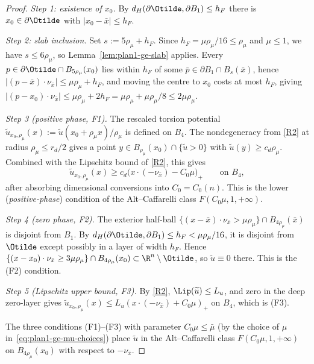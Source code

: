 \begin{proof}
\emph{Step 1: existence of \(x_0\).} By
\(d_H(\partial\Otilde,\partial B_1)\le h_F\) there is
\(x_0\in\partial\Otilde\) with \(|x_0-\bar x|\le h_F\).

\emph{Step 2: slab inclusion.} Set \(s:=5\rho_\mu+h_F\). Since
\(h_F=\mu\rho_\mu/16\le\rho_\mu\) and \(\mu\le 1\), we have
\(s\le 6\rho_\mu\), so Lemma~\ref{lem:plan1-ge-slab} applies. Every
\(p\in\partial\Otilde\cap B_{5\rho_\mu}(x_0)\) lies within \(h_F\) of
some \(\bar p\in\partial B_1\cap B_s(\bar x)\), hence
\(|(p-\bar x)\cdot\nu_{\bar x}|\le\mu\rho_\mu+h_F\), and moving the
centre to \(x_0\) costs at most \(h_F\), giving
\(|(p-x_0)\cdot\nu_{\bar x}|\le\mu\rho_\mu+2h_F=\mu\rho_\mu+\mu\rho_\mu/8
\le 2\mu\rho_\mu\).

\emph{Step 3 (positive phase, F1).} The rescaled torsion potential
\(\widetilde u_{x_0,\rho_\mu}(x):=\widetilde u(x_0+\rho_\mu x)/\rho_\mu\)
is defined on \(B_4\). The nondegeneracy from \ref{R2} at radius
\(\rho_\mu\le r_d/2\) gives a point \(y\in B_{\rho_\mu}(x_0)\cap\{\widetilde u>0\}\)
with \(\widetilde u(y)\ge c_d\rho_\mu\). Combined with the Lipschitz bound
of \ref{R2}, this gives
\[
   \widetilde u_{x_0,\rho_\mu}(x)\ge c_d\bigl(x\cdot(-\nu_{\bar x})-C_0\mu\bigr)_+
   \qquad\text{on }B_4,
\]
after absorbing dimensional conversions into \(C_0=C_0(n)\). This is the
lower (\emph{positive-phase}) condition of the Alt--Caffarelli class
\(F(C_0\mu,1,+\infty)\).

\emph{Step 4 (zero phase, F2).} The exterior half-ball
\(\{(x-\bar x)\cdot\nu_{\bar x}>\mu\rho_\mu\}\cap B_{4\rho_\mu}(\bar x)\)
is disjoint from \(B_1\). By
\(d_H(\partial\Otilde,\partial B_1)\le h_F<\mu\rho_\mu/16\), it is
disjoint from \(\Otilde\) except possibly in a layer of width \(h_F\).
Hence
\(\{(x-x_0)\cdot\nu_{\bar x}\ge 3\mu\rho_\mu\}\cap B_{4\rho_\mu}(x_0)
\subset\R^n\setminus\Otilde\), so \(\widetilde u\equiv 0\) there. This is
the (F2) condition.

\emph{Step 5 (Lipschitz upper bound, F3).} By \ref{R2},
\(\Lip(\widetilde u)\le L_u\), and zero in the deep zero-layer gives
\(\widetilde u_{x_0,\rho_\mu}(x)\le
L_u(x\cdot(-\nu_{\bar x})+C_0\mu)_+\) on \(B_4\), which is (F3).

The three conditions (F1)--(F3) with parameter \(C_0\mu\le\bar\mu\) (by
the choice of \(\mu\) in~\eqref{eq:plan1-ge-mu-choices}) place
\(\widetilde u\) in the Alt--Caffarelli class
\(F(C_0\mu,1,+\infty)\) on \(B_{4\rho_\mu}(x_0)\) with respect to
\(-\nu_{\bar x}\).
\end{proof}

